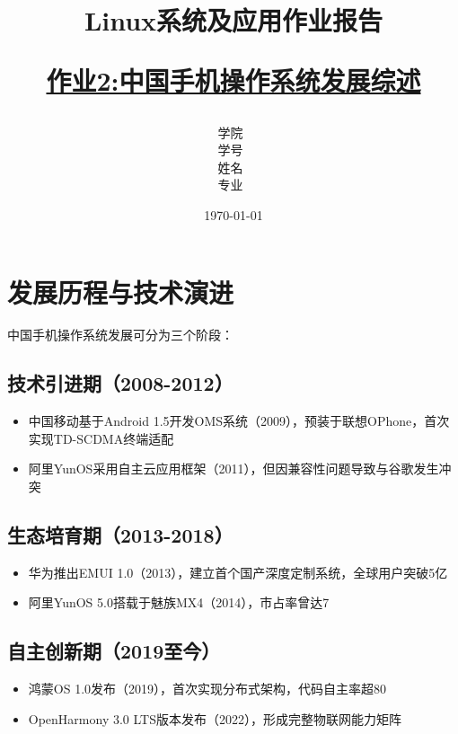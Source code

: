\documentclass[12pt,hyperref,a4paper,UTF8]{ctexart}
\title{ 
        \vspace{1cm}
        \heiti \Huge \textbf{Linux系统及应用作业报告} \par
        \vspace{1cm} 
        \heiti \Large {\underline{作业2:中国手机操作系统发展综述}   } 
        \vspace{3cm}
    
    }
\author{
        \vspace{0.5cm}
        \kaishu\Large 学院\ \dlmu[9cm]{卓越学院} \\ %
        \vspace{0.5cm}
        \kaishu\Large 学号\ \dlmu[9cm]{23040447} \\ %
        \vspace{0.5cm}
        \kaishu\Large 姓名\ \dlmu[9cm]{陈文轩} \qquad  \\ %
        \vspace{0.5cm}
        \kaishu\Large 专业\ \dlmu[9cm]{智能硬件与系统(电子信息工程)} \qquad \\ %
    }
\date{\today} %
\begin{document}
\cover
\thispagestyle{empty} %







\newpage
\setcounter{page}{1} %


\section{发展历程与技术演进}
中国手机操作系统发展可分为三个阶段：

\subsection{技术引进期（2008-2012）}
\begin{itemize}
    \item 中国移动基于Android 1.5开发OMS系统（2009），预装于联想OPhone，首次实现TD-SCDMA终端适配
    \item 阿里YunOS采用自主云应用框架（2011），但因兼容性问题导致与谷歌发生冲突\cite{yunos2012}
\end{itemize}

\subsection{生态培育期（2013-2018）}
\begin{itemize}
    \item 华为推出EMUI 1.0（2013），建立首个国产深度定制系统，全球用户突破5亿
    \item 阿里YunOS 5.0搭载于魅族MX4（2014），市占率曾达7%
\end{itemize}

\subsection{自主创新期（2019至今）}
\begin{itemize}
    \item 鸿蒙OS 1.0发布（2019），首次实现分布式架构，代码自主率超80%
    \item OpenHarmony 3.0 LTS版本发布（2022），形成完整物联网能力矩阵
\end{itemize}
\end{document}
